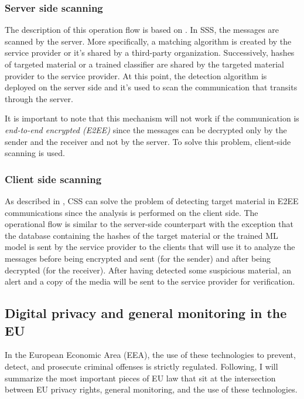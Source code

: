 \subsubsection*{Server side scanning}

The description of this operation flow is based on \cite{abelson2024bugs}. In SSS, the messages are scanned by the server. More specifically, a matching algorithm is created by the service provider or it's shared by a third-party organization. Successively, hashes of targeted material or a trained classifier are shared by the targeted material provider to the service provider. At this point, the detection algorithm is deployed on the server side and it's used to scan the communication that transits through the server. 

It is important to note that this mechanism will not work if the communication is \textit{end-to-end encrypted (E2EE)} since the messages can be decrypted only by the sender and the receiver and not by the server. To solve this problem, client-side scanning is used.

\subsubsection*{Client side scanning}

As described in \cite{abelson2024bugs}, CSS can solve the problem of detecting target material in E2EE communications since the analysis is performed on the client side. The operational flow is similar to the server-side counterpart with the exception that the database containing the hashes of the target material or the trained ML model is sent by the service provider to the clients that will use it to analyze the messages before being encrypted and sent (for the sender) and after being decrypted (for the receiver)\cite{abelson2024bugs}. After having detected some suspicious material, an alert and a copy of the media will be sent to the service provider for verification.

\subsection{Digital privacy and general monitoring in the EU}

In the European Economic Area (EEA), the use of these technologies to prevent, detect, and prosecute criminal offenses is strictly regulated. Following, I will summarize the most important pieces of EU law that sit at the intersection between EU privacy rights, general monitoring, and the use of these technologies.

